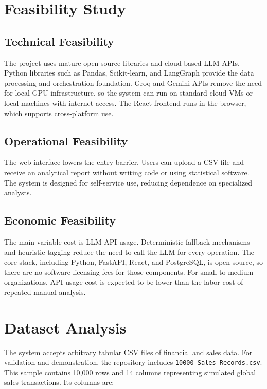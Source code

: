 \documentclass[12pt,a4paper,openany]{report}
\begin{document}
\section{Feasibility Study}

\subsection{Technical Feasibility}
The project uses mature open-source libraries and cloud-based LLM APIs. Python libraries such as Pandas, Scikit-learn, and LangGraph provide the data processing and orchestration foundation. Groq and Gemini APIs remove the need for local GPU infrastructure, so the system can run on standard cloud VMs or local machines with internet access. The React frontend runs in the browser, which supports cross-platform use.

\subsection{Operational Feasibility}
The web interface lowers the entry barrier. Users can upload a CSV file and receive an analytical report without writing code or using statistical software. The system is designed for self-service use, reducing dependence on specialized analysts.

\subsection{Economic Feasibility}
The main variable cost is LLM API usage. Deterministic fallback mechanisms and heuristic tagging reduce the need to call the LLM for every operation. The core stack, including Python, FastAPI, React, and PostgreSQL, is open source, so there are no software licensing fees for those components. For small to medium organizations, API usage cost is expected to be lower than the labor cost of repeated manual analysis.

\section{Dataset Analysis}
The system accepts arbitrary tabular CSV files of financial and sales data. For validation and demonstration, the repository includes \texttt{10000 Sales Records.csv}. This sample contains 10,000 rows and 14 columns representing simulated global sales transactions. Its columns are:
\end{document}
